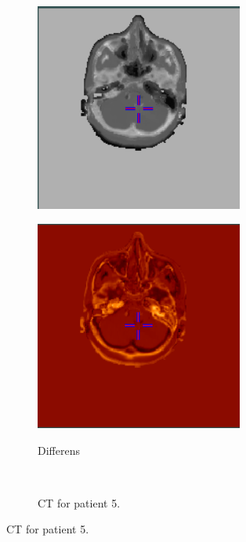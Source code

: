 \begin{figure}
\begin{subfigure}[b]{0.3\textwidth}
        \includegraphics[width=0.75\textwidth]{colager/loocv_ct/loocv_010960_sct.png}
        \label{col:loocv_ct_pat4_sct}
    \end{subfigure}\hfill
    \begin{subfigure}[b]{0.3\textwidth}
        \caption{Differens}
        \includegraphics[width=0.75\textwidth]{colager/loocv_ct/loocv_010960_sub.png}
        \label{col:loocv_ct_pat4_sub}
    \end{subfigure}\\
    \begin{subfigure}[b]{0.3\textwidth}
        \caption{CT for patient 5.}

\end{subfigure}
\end{figure}
